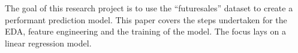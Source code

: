 
\begin{sciabstract}
The goal of this research project is to use the \enquote{\gls{futuresales}} dataset to create a performant prediction model. This paper covers the steps undertaken for the EDA, feature engineering and the training of the model. The focus lays on a linear regression model.
\end{sciabstract}

\clearpage
